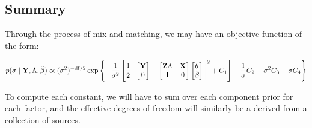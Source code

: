 \documentclass[10pt]{article}
\begin{document}
\subsection*{Summary}

Through the process of mix-and-matching, we may have an objective function
of the form:

\begin{equation*}
p(\sigma \mid {\bf Y}, \Lambda, \tilde\beta) \propto
(\sigma^2)^{-\mathrm{df}/2} \exp\left\{
-\frac{1}{\sigma^2}\left[\frac{1}{2}
\left\|\begin{bmatrix}{\bf Y} \\ 0 \end{bmatrix}
- \begin{bmatrix} {\bf Z}\Lambda & {\bf X} \\ {\bf I} &
  0 \end{bmatrix}
\begin{bmatrix}\tilde\theta \\ \tilde\beta \end{bmatrix}
\right\|^2
+C_1\right]-\frac{1}{\sigma}C_2-\sigma^2C_3-\sigma C_4
\right\}
\end{equation*}

To compute each constant, we will have to sum over each component
prior for each factor, and the effective degrees of freedom will
similarly be a derived from a collection of sources.
\end{document}
